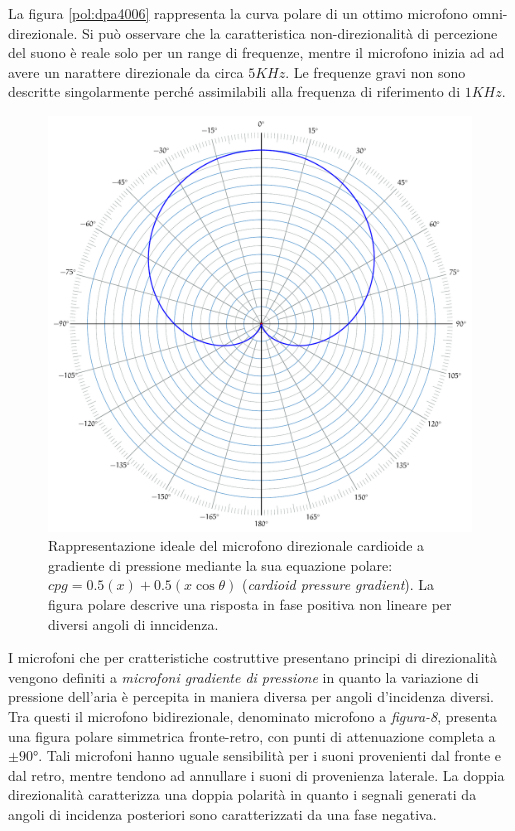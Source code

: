 La figura \ref{pol:dpa4006} rappresenta la curva polare di un ottimo microfono
omni-direzionale. Si può osservare che la caratteristica non-direzionalità di
percezione del suono è reale solo per un range di frequenze, mentre il microfono
inizia ad ad avere un narattere direzionale da circa $5KHz$. Le frequenze gravi non
sono descritte singolarmente perché assimilabili alla frequenza di riferimento di $1KHz$.

\begin{figure}[t]
\centering
\includegraphics[width=1\columnwidth]{CAPITOLI/_TIKZ/POLAR/cardioid}
\caption{Rappresentazione ideale del microfono direzionale cardioide a gradiente
di pressione mediante la sua equazione polare: $cpg = 0.5(x) + 0.5(x\cos\theta)$
(\emph{cardioid pressure gradient}). La figura polare descrive una risposta in
fase positiva non lineare per diversi angoli di inncidenza.}
\label{polar:cardioid}
\end{figure}

I microfoni che per cratteristiche costruttive presentano principi di direzionalità
vengono definiti a \emph{microfoni gradiente di pressione} in quanto la variazione
di pressione dell'aria è percepita in maniera diversa per angoli d'incidenza diversi.
Tra questi il microfono bidirezionale, denominato microfono a \emph{figura-8},
presenta una figura polare simmetrica fronte-retro, con punti di attenuazione
completa a $\pm90°$. Tali microfoni hanno uguale sensibilità per i suoni
provenienti dal fronte e dal retro, mentre tendono ad annullare i suoni di
provenienza laterale. La doppia direzionalità caratterizza una doppia polarità
in quanto i segnali generati da angoli di incidenza posteriori sono caratterizzati da
una fase negativa.

